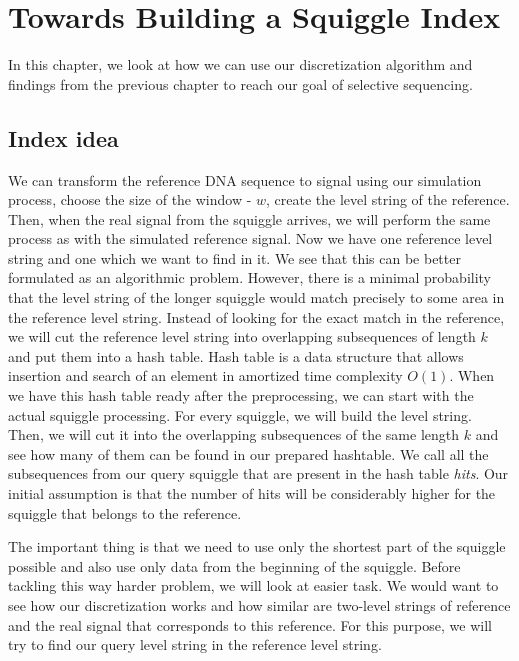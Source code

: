 \chapter{Towards Building a Squiggle Index}

\label{kap:methAdjust} %

In this chapter, we look at how we can use our discretization algorithm and findings
from the previous chapter to reach our goal of selective sequencing.

\section{Index idea}

We can transform the reference DNA sequence to signal using our simulation
process, choose the size of the window - $w$, create the level string of the reference.
Then, when the real signal from the squiggle arrives, we will perform the same process
as with the simulated reference signal. Now we have one reference level string and
one which we want to find in it. We see that this can be better formulated as an
algorithmic problem. However, there is a minimal probability that the level string
of the longer squiggle would match precisely to some area in the reference level string.
Instead of looking for the exact match in the reference, we will cut the reference
level string into overlapping subsequences of length $k$ and put them into a hash table.
Hash table is a data structure that allows insertion and search of an element in
amortized time complexity $O(1)$. When we have this hash table ready after the
preprocessing, we can start with the actual squiggle processing. For every squiggle, we will
build the level string. Then, we will cut it into the overlapping
subsequences of the same length $k$ and see how many of them can be found in our
prepared hashtable. We call all the subsequences from our query squiggle that are
present in the hash table \textit{hits}. Our initial assumption is that the number
of hits will be considerably higher for the squiggle that belongs to the reference.

The important thing is that we need to use only the shortest part of the squiggle
possible and also use only data from the beginning of the squiggle. Before tackling
this way harder problem, we will look at easier task. We would want to see how
our discretization works and how similar are two-level strings of reference and
the real signal that corresponds to this reference. For this purpose, we will try to
find our query level string in the reference level string.

